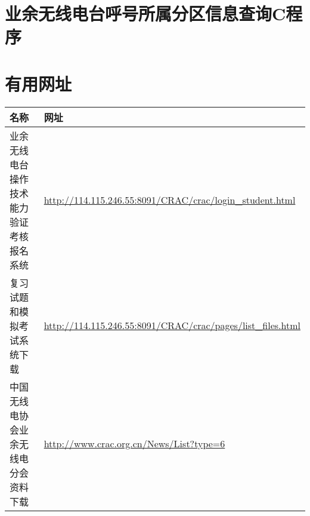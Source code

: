 \section{业余无线电台呼号所属分区信息查询C程序}



\newpage

\section{有用网址}

\begin{longtable}{|p{8cm}|p{8cm}|}
	\hline
	\textbf{名称} & \textbf{网址} \\
	\hline
	业余无线电台操作技术能力验证考核报名系统 & \url{http://114.115.246.55:8091/CRAC/crac/login_student.html} \\
	\hline
	复习试题和模拟考试系统下载 & \url{http://114.115.246.55:8091/CRAC/crac/pages/list_files.html} \\
	\hline
	中国无线电协会业余无线电分会资料下载 & \url{http://www.crac.org.cn/News/List?type=6} \\
	\hline
\end{longtable}
